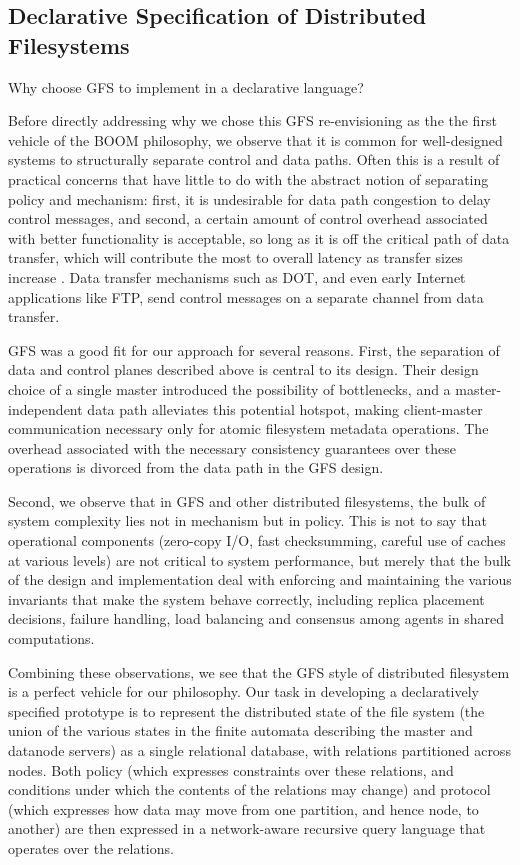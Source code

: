\documentclass{article}
\begin{document}
\subsection{Declarative Specification of Distributed Filesystems}
Why choose GFS to implement in a declarative language?

Before directly addressing why we chose this GFS re-envisioning as the the first vehicle of the BOOM philosophy, we observe that it is common for well-designed systems to structurally separate control and data paths.  Often this is a result of practical concerns that have little to do with the abstract notion of separating policy and mechanism: first, it is undesirable for data path congestion to delay control messages, and second, a certain amount of control overhead associated with better functionality is acceptable, so long as it is off the critical path of data transfer, which will contribute the most to overall latency as transfer sizes increase .  Data transfer mechanisms such as DOT, and even early Internet applications like FTP, send control messages on a separate channel from data transfer.

GFS was a good fit for our approach for several reasons.  First, the separation of data and control planes described above is central to its design.  Their design choice of a single master introduced the possibility of bottlenecks, and a master-independent data path alleviates this potential hotspot, making client-master communication necessary only for atomic filesystem metadata operations.   The overhead associated with the necessary consistency guarantees over these operations is divorced from the data path in the GFS design.

Second, we observe that in GFS and other distributed filesystems, the bulk of system complexity lies not in mechanism but in policy.  This is not to say that operational components (zero-copy I/O, fast checksumming, careful use of caches at various levels) are not critical to system performance, but merely that the bulk of the design and implementation deal with enforcing and maintaining the various invariants that make the system behave correctly, including replica placement decisions, failure handling, load balancing and consensus among agents in shared computations.

Combining these observations, we see that the GFS style of distributed filesystem is a perfect vehicle for our philosophy.  Our task in developing a declaratively specified prototype is to represent the distributed state of the file system (the union of the various states in the finite automata describing the master and datanode servers) as a single relational database, with relations partitioned across nodes.  Both policy (which expresses constraints over these relations, and conditions under which the contents of the relations may change) and protocol (which expresses how data may move from one partition, and hence node,  to another) are then expressed in a network-aware recursive query language that operates over the relations.
\end{document}
